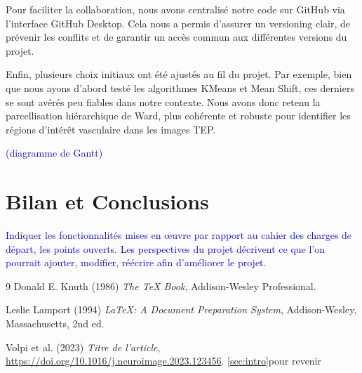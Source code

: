 \documentclass{article}
\begin{document}
    \noindent
    Pour faciliter la collaboration, nous avons centralisé notre code sur GitHub via l’interface GitHub Desktop. Cela nous a permis d’assurer un versioning clair, de prévenir les conflits et de garantir un accès commun aux différentes versions du projet.
    
    \noindent
    Enfin, plusieurs choix initiaux ont été ajustés au fil du projet. Par exemple, bien que nous ayons d’abord testé les algorithmes KMeans et Mean Shift, ces derniers se sont avérés peu fiables dans notre contexte. Nous avons donc retenu la parcellisation hiérarchique de Ward, plus cohérente et robuste pour identifier les régions d’intérêt vasculaire dans les images TEP.
      
    \textcolor{blue}{ (diagramme de Gantt)}







  


\section{Bilan et Conclusions}
    \textcolor{blue}{
    Indiquer les fonctionnalités mises en œuvre par rapport au cahier des charges de départ, les points ouverts.
    Les perspectives du projet décrivent ce que l’on pourrait ajouter, modifier, réécrire afin d’améliorer le projet.
    }




\begin{thebibliography}{9}
Donald E. Knuth (1986) \emph{The \TeX{} Book}, Addison-Wesley Professional.

Leslie Lamport (1994) \emph{\LaTeX: A Document Preparation System}, Addison-Wesley, Massachusetts, 2nd ed.

\label{sec:volpi}
Volpi et al. (2023) \emph{Titre de l'article}, \url{https://doi.org/10.1016/j.neuroimage.2023.123456}.
\ref{sec:intro}pour revenir

\end{thebibliography}





        
\end{document}
